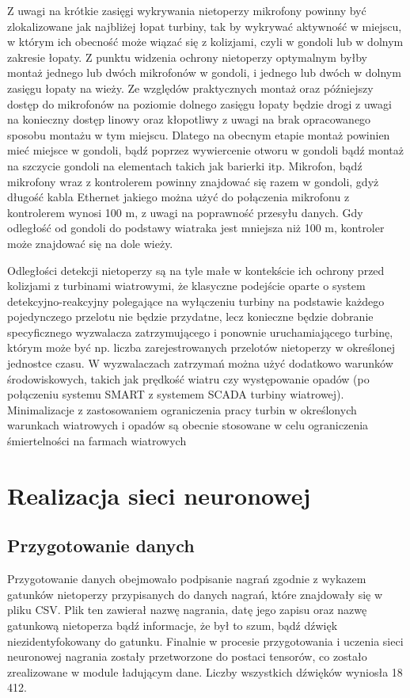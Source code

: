 \documentclass{sprz}
\begin{document}
Z uwagi na krótkie zasięgi wykrywania nietoperzy mikrofony powinny być zlokalizowane jak najbliżej łopat turbiny, tak by wykrywać aktywność w miejscu, w którym ich obecność może wiązać się z kolizjami, czyli w gondoli lub w dolnym zakresie łopaty. Z punktu widzenia ochrony nietoperzy optymalnym byłby montaż jednego lub dwóch mikrofonów w gondoli, i jednego lub dwóch w dolnym zasięgu łopaty na wieży. Ze względów praktycznych montaż oraz późniejszy dostęp do mikrofonów na poziomie dolnego zasięgu łopaty będzie drogi z uwagi na konieczny dostęp linowy oraz kłopotliwy z uwagi na brak opracowanego sposobu montażu w tym miejscu. Dlatego na obecnym etapie montaż powinien mieć miejsce w gondoli, bądź poprzez wywiercenie otworu w gondoli bądź montaż na szczycie gondoli na elementach takich jak barierki itp.
Mikrofon, bądź mikrofony wraz z kontrolerem powinny znajdować się razem w gondoli, gdyż długość kabla Ethernet jakiego można użyć do połączenia mikrofonu z kontrolerem wynosi 100 m, z uwagi na poprawność przesyłu danych. Gdy odległość od gondoli do podstawy wiatraka jest mniejsza niż 100 m, kontroler może znajdować się na dole wieży.

Odległości detekcji nietoperzy są na tyle małe w kontekście ich ochrony przed kolizjami z turbinami wiatrowymi, że klasyczne podejście oparte o system detekcyjno-reakcyjny polegające na wyłączeniu turbiny na podstawie każdego pojedynczego przelotu nie będzie przydatne, lecz konieczne będzie dobranie specyficznego wyzwalacza zatrzymującego i ponownie uruchamiającego turbinę, którym może być np. liczba zarejestrowanych przelotów nietoperzy w określonej jednostce czasu. W wyzwalaczach zatrzymań można użyć dodatkowo warunków środowiskowych, takich jak prędkość wiatru czy występowanie opadów (po połączeniu systemu SMART z systemem SCADA turbiny wiatrowej). Minimalizacje z zastosowaniem ograniczenia pracy turbin w określonych warunkach wiatrowych i opadów są obecnie stosowane w celu ograniczenia śmiertelności na farmach wiatrowych \cite{Wytyczne}

\chapter{Realizacja sieci neuronowej}

\section{Przygotowanie danych}
Przygotowanie danych obejmowało podpisanie nagrań zgodnie z wykazem gatunków nietoperzy przypisanych do danych nagrań, które znajdowały się w pliku CSV. Plik ten zawierał nazwę nagrania, datę jego zapisu oraz nazwę gatunkową nietoperza bądź informacje, że był to szum, bądź dźwięk niezidentyfokowany do gatunku. Finalnie w procesie przygotowania i uczenia sieci neuronowej nagrania zostały przetworzone do postaci tensorów, co zostało zrealizowane w module ładującym dane. Liczby wszystkich dźwięków wyniosła 18 412.
\end{document}
